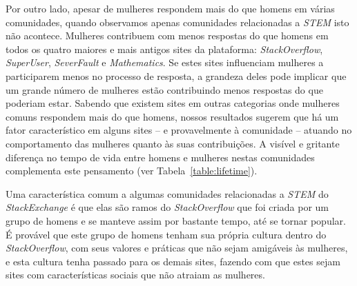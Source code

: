 

Por outro lado, apesar de mulheres respondem mais do que homens em várias comunidades, quando observamos apenas comunidades relacionadas a \emph{STEM} isto não acontece. Mulheres contribuem com menos respostas do que homens em todos os quatro maiores e mais antigos sites da plataforma: \emph{StackOverflow}, \emph{SuperUser}, \emph{SeverFault} e \emph{Mathematics}. Se estes sites influenciam mulheres a participarem menos no processo de resposta, a grandeza deles pode implicar que um grande número de mulheres estão contribuindo menos respostas do que poderiam estar. Sabendo que existem sites em outras categorias onde mulheres comuns respondem mais do que homens, nossos resultados sugerem que há um fator característico em alguns sites -- e provavelmente à comunidade -- atuando no comportamento das mulheres quanto às suas contribuições. A visível e gritante diferença no tempo de vida entre homens e mulheres nestas comunidades complementa este pensamento (ver Tabela~\ref{table:lifetime}).

Uma característica comum a algumas comunidades relacionadas a \emph{STEM} do \emph{StackExchange} é que elas são ramos do \emph{StackOverflow} que foi criada por um grupo de homens e se manteve assim por bastante tempo, até se tornar popular. É provável que este grupo de homens tenham sua própria cultura dentro do \emph{StackOverflow}, com seus valores e práticas que não sejam amigáveis às mulheres, e esta cultura tenha passado para os demais sites, fazendo com que estes sejam sites com características sociais que não atraiam as mulheres.

